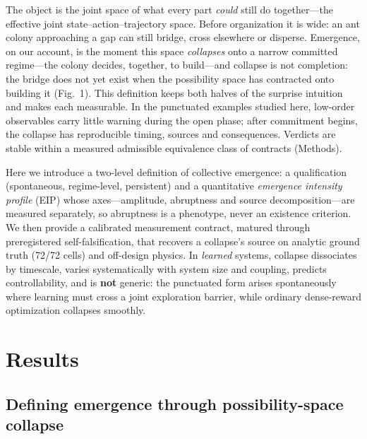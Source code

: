 \documentclass[11pt]{article}
\begin{document}
The object is the joint space of what every part \emph{could} still do
together---the effective joint state--action--trajectory space. Before
organization it is wide: an ant colony approaching a gap can still
bridge, cross elsewhere or disperse\citep{reid2015army}. Emergence, on
our account, is the moment this space \emph{collapses} onto a narrow
committed regime---the colony decides, together, to build---and
collapse is not completion: the bridge does not yet exist when the
possibility space has contracted onto building it (Fig.~1). This
definition keeps both halves of the surprise intuition and makes each
measurable. In the punctuated examples studied here, low-order
observables carry little warning during the open phase; after
commitment begins, the collapse has reproducible timing, sources and
consequences. Verdicts are stable within a measured
admissible equivalence class of contracts (Methods).

Here we introduce a two-level definition of collective emergence: a
qualification
(spontaneous, regime-level, persistent) and a quantitative
\emph{emergence intensity profile} (EIP) whose axes---amplitude,
abruptness and source decomposition---are measured separately, so
abruptness is a phenotype, never an existence criterion. We then
provide a calibrated measurement
contract, matured through preregistered self-falsification, that
recovers a collapse's source on analytic ground truth (72/72 cells)
and off-design physics. In \emph{learned} systems, collapse
dissociates by timescale, varies
systematically with system size and coupling, predicts
controllability, and is \textbf{not} generic: the punctuated form
arises spontaneously where learning must cross a joint exploration
barrier, while ordinary dense-reward optimization collapses smoothly.

\section*{Results}

\subsection*{Defining emergence through possibility-space collapse}
\end{document}

